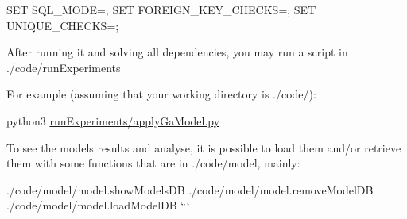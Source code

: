 S\+ET S\+Q\+L\+\_\+\+M\+O\+DE=; S\+ET F\+O\+R\+E\+I\+G\+N\+\_\+\+K\+E\+Y\+\_\+\+C\+H\+E\+C\+KS=; S\+ET U\+N\+I\+Q\+U\+E\+\_\+\+C\+H\+E\+C\+KS=;

After running it and solving all dependencies, you may run a script in ./code/run\+Experiments

For example (assuming that your working directory is ./code/)\+:

python3 \hyperlink{apply_ga_model_8py}{run\+Experiments/apply\+Ga\+Model.\+py}

To see the models results and analyse, it is possible to load them and/or retrieve them with some functions that are in ./code/model, mainly\+:

./code/model/model.show\+Models\+DB ./code/model/model.remove\+Model\+DB ./code/model/model.load\+Model\+DB ``` 
